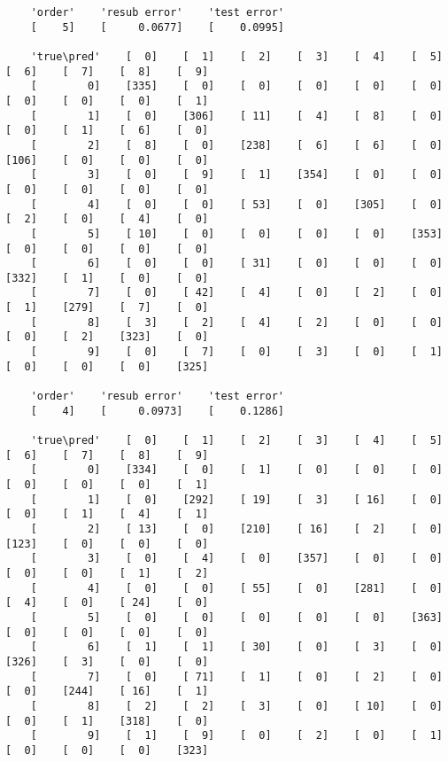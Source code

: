 \documentclass[fleqn]{article}
\theoremstyle{definition}
\theoremstyle{remark}
\begin{document}
\begin{verbatim}
    'order'    'resub error'    'test error'
    [    5]    [     0.0677]    [    0.0995]

    'true\pred'    [  0]    [  1]    [  2]    [  3]    [  4]    [  5]    [  6]    [  7]    [  8]    [  9]
    [        0]    [335]    [  0]    [  0]    [  0]    [  0]    [  0]    [  0]    [  0]    [  0]    [  1]
    [        1]    [  0]    [306]    [ 11]    [  4]    [  8]    [  0]    [  0]    [  1]    [  6]    [  0]
    [        2]    [  8]    [  0]    [238]    [  6]    [  6]    [  0]    [106]    [  0]    [  0]    [  0]
    [        3]    [  0]    [  9]    [  1]    [354]    [  0]    [  0]    [  0]    [  0]    [  0]    [  0]
    [        4]    [  0]    [  0]    [ 53]    [  0]    [305]    [  0]    [  2]    [  0]    [  4]    [  0]
    [        5]    [ 10]    [  0]    [  0]    [  0]    [  0]    [353]    [  0]    [  0]    [  0]    [  0]
    [        6]    [  0]    [  0]    [ 31]    [  0]    [  0]    [  0]    [332]    [  1]    [  0]    [  0]
    [        7]    [  0]    [ 42]    [  4]    [  0]    [  2]    [  0]    [  1]    [279]    [  7]    [  0]
    [        8]    [  3]    [  2]    [  4]    [  2]    [  0]    [  0]    [  0]    [  2]    [323]    [  0]
    [        9]    [  0]    [  7]    [  0]    [  3]    [  0]    [  1]    [  0]    [  0]    [  0]    [325]

    'order'    'resub error'    'test error'
    [    4]    [     0.0973]    [    0.1286]

    'true\pred'    [  0]    [  1]    [  2]    [  3]    [  4]    [  5]    [  6]    [  7]    [  8]    [  9]
    [        0]    [334]    [  0]    [  1]    [  0]    [  0]    [  0]    [  0]    [  0]    [  0]    [  1]
    [        1]    [  0]    [292]    [ 19]    [  3]    [ 16]    [  0]    [  0]    [  1]    [  4]    [  1]
    [        2]    [ 13]    [  0]    [210]    [ 16]    [  2]    [  0]    [123]    [  0]    [  0]    [  0]
    [        3]    [  0]    [  4]    [  0]    [357]    [  0]    [  0]    [  0]    [  0]    [  1]    [  2]
    [        4]    [  0]    [  0]    [ 55]    [  0]    [281]    [  0]    [  4]    [  0]    [ 24]    [  0]
    [        5]    [  0]    [  0]    [  0]    [  0]    [  0]    [363]    [  0]    [  0]    [  0]    [  0]
    [        6]    [  1]    [  1]    [ 30]    [  0]    [  3]    [  0]    [326]    [  3]    [  0]    [  0]
    [        7]    [  0]    [ 71]    [  1]    [  0]    [  2]    [  0]    [  0]    [244]    [ 16]    [  1]
    [        8]    [  2]    [  2]    [  3]    [  0]    [ 10]    [  0]    [  0]    [  1]    [318]    [  0]
    [        9]    [  1]    [  9]    [  0]    [  2]    [  0]    [  1]    [  0]    [  0]    [  0]    [323]


\end{verbatim}
\end{document}
